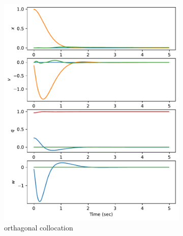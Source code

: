 \documentclass[]{article}
\begin{document}
\begin{figure}[H]
	\centering
	\begin{subfigure}[b]{0.3\textwidth}
		\centering
		\includegraphics[width=\textwidth]{figures/statey115dx1.pdf}
		\caption{orthagonal collocation}
	\end{subfigure}%
	\begin{subfigure}[b]{0.3\textwidth}
		\centering

\end{subfigure}
\end{figure}
\end{document}
